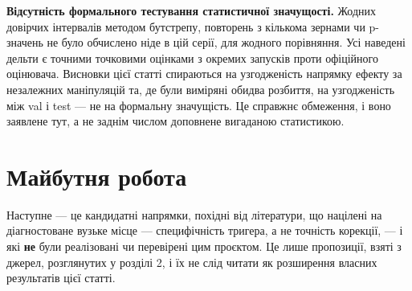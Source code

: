 \documentclass[11pt]{article}
\begin{document}
\textbf{Відсутність формального тестування статистичної значущості.} Жодних довірчих інтервалів методом бутстрепу, повторень з кількома зернами чи p-значень не було обчислено ніде в цій серії, для жодного порівняння. Усі наведені дельти є точними точковими оцінками з окремих запусків проти офіційного оцінювача. Висновки цієї статті спираються на узгодженість напрямку ефекту за незалежних маніпуляцій та, де були виміряні обидва розбиття, на узгодженість між val і test --- не на формальну значущість. Це справжнє обмеження, і воно заявлене тут, а не заднім числом доповнене вигаданою статистикою.

\section{Майбутня робота}

Наступне --- це кандидатні напрямки, похідні від літератури, що націлені на діагностоване вузьке місце --- специфічність тригера, а не точність корекції, --- і які \textbf{не} були реалізовані чи перевірені цим проєктом. Це лише пропозиції, взяті з джерел, розглянутих у розділі 2, і їх не слід читати як розширення власних результатів цієї статті.
\end{document}
